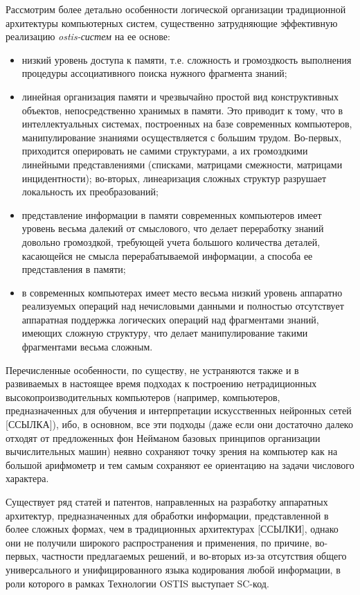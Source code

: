 Рассмотрим более детально особенности логической организации традиционной архитектуры компьютерных систем, существенно затрудняющие эффективную реализацию \textit{ostis-систем} на ее основе:
\begin{itemize}
	\item низкий уровень доступа к памяти, т.е. сложность и громоздкость выполнения процедуры ассоциативного поиска нужного фрагмента знаний; 
	\item линейная организация памяти и чрезвычайно простой вид конструктивных объектов, непосредственно хранимых в памяти. Это приводит к тому, что в интеллектуальных системах, построенных на базе современных компьютеров, манипулирование знаниями осуществляется с большим трудом. Во-первых, приходится оперировать не самими структурами, а их громоздкими линейными представлениями (списками, матрицами смежности, матрицами инцидентности); во-вторых, линеаризация сложных структур разрушает локальность их преобразований;
	\item представление информации в памяти современных компьютеров имеет уровень весьма далекий от смыслового, что делает переработку знаний довольно громоздкой, требующей учета большого количества деталей, касающейся не смысла перерабатываемой информации, а способа ее представления в памяти;
	\item в современных компьютерах имеет место весьма низкий уровень аппаратно реализуемых операций над нечисловыми данными и полностью отсутствует аппаратная поддержка логических операций над фрагментами знаний, имеющих сложную структуру, что делает манипулирование такими фрагментами весьма сложным.
\end{itemize}

Перечисленные особенности, по существу, не устраняются также и в развиваемых в настоящее время подходах к построению нетрадиционных высокопроизводительных компьютеров (например, компьютеров, предназначенных для обучения и интерпретации искусственных нейронных сетей [ССЫЛКА]), ибо, в основном, все эти подходы (даже если они достаточно далеко отходят от предложенных фон Нейманом базовых принципов организации вычислительных машин) неявно сохраняют точку зрения на компьютер как на большой арифмометр и тем самым сохраняют ее ориентацию на задачи числового характера.

Существует ряд статей и патентов, направленных на разработку аппаратных архитектур, предназначенных для обработки информации, представленной в более сложных формах, чем в традиционных архитектурах [ССЫЛКИ], однако они не получили широкого распространения и применения, по причине, во-первых, частности предлагаемых решений, и во-вторых из-за отсутствия общего универсального и унифицированного языка кодирования любой информации, в роли которого в рамках Технологии OSTIS выступает SC-код.

